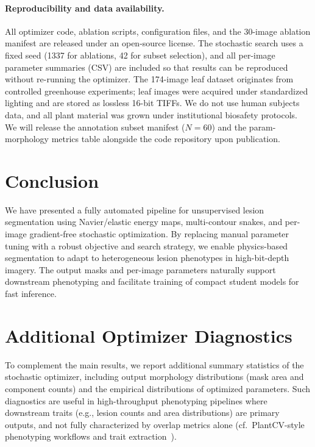 \documentclass[journal]{IEEEtran}
\begin{document}
\paragraph{Reproducibility and data availability.}
All optimizer code, ablation scripts, configuration files, and the 30-image ablation manifest are released under an open-source license. The stochastic search uses a fixed seed (1337 for ablations, 42 for subset selection), and all per-image parameter summaries (CSV) are included so that results can be reproduced without re-running the optimizer. The 174-image leaf dataset originates from controlled greenhouse experiments; leaf images were acquired under standardized lighting and are stored as lossless 16-bit TIFFs. We do not use human subjects data, and all plant material was grown under institutional biosafety protocols. We will release the annotation subset manifest ($N{=}60$) and the param-morphology metrics table alongside the code repository upon publication.

\section{Conclusion}
We have presented a fully automated pipeline for unsupervised lesion segmentation using Navier/elastic energy maps, multi-contour snakes, and per-image gradient-free stochastic optimization. By replacing manual parameter tuning with a robust objective and search strategy, we enable physics-based segmentation to adapt to heterogeneous lesion phenotypes in high-bit-depth imagery. The output masks and per-image parameters naturally support downstream phenotyping and facilitate training of compact student models for fast inference.

\appendices
\section{Additional Optimizer Diagnostics}
To complement the main results, we report additional summary statistics of the stochastic optimizer, including output morphology distributions (mask area and component counts) and the empirical distributions of optimized parameters. Such diagnostics are useful in high-throughput phenotyping pipelines where downstream traits (e.g., lesion counts and area distributions) are primary outputs, and not fully characterized by overlap metrics alone (cf.\ PlantCV-style phenotyping workflows and trait extraction~\cite{plantcv2025}).
\end{document}
